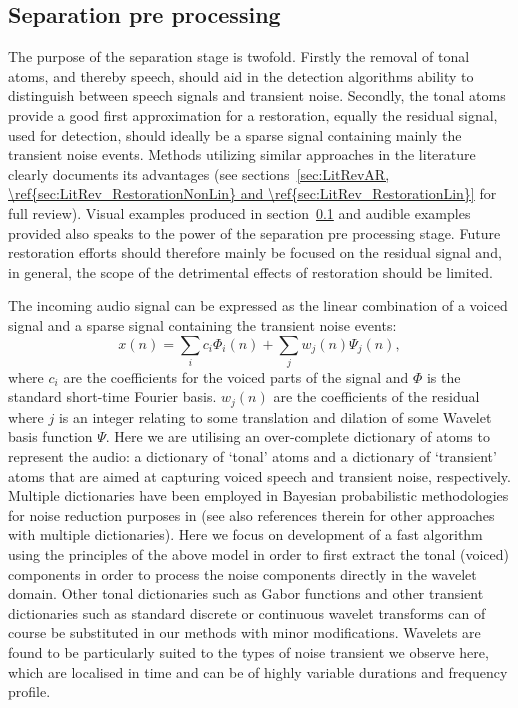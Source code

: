 \subsection{Separation pre processing}\label{sec:WPseparation}
The purpose of the separation stage is twofold. Firstly the removal of tonal atoms, and thereby speech, should aid in the detection algorithms ability to distinguish between speech signals and transient noise. Secondly, the tonal atoms provide a good first approximation for a restoration, equally the residual signal, used for detection, should ideally be a sparse signal containing mainly the transient noise events. Methods utilizing similar approaches in the literature clearly documents its advantages\cite{Godsill1998book} (see sections~\ref{sec:LitRevAR, \ref{sec:LitRev_RestorationNonLin} and \ref{sec:LitRev_RestorationLin}} for full review). Visual examples produced in section~\ref{sec:WPseparation} and audible examples provided  also speaks to the power of the separation pre processing stage.
Future restoration efforts should therefore mainly be focused on the residual signal and, in general, the scope of the detrimental effects of restoration should be limited.

The incoming audio signal can be expressed as the linear combination of a voiced signal and a sparse signal containing the transient noise events:
\begin{equation}\label{eq:modelgeneral}
    x(n) = \sum_i c_i \Phi_i(n) + \sum_{j} w_{j}(n) \Psi_{j}(n),
\end{equation}
where $c_i$ are the coefficients for the voiced parts of the signal and $\Phi$ is the standard short-time Fourier basis. $w_{j}(n)$ are the coefficients of the residual where $j$ is an integer relating to some translation and dilation of some Wavelet basis function $\Psi$. Here we are utilising an over-complete dictionary of atoms to represent the audio: a dictionary of `tonal' atoms and a dictionary of `transient' atoms that are aimed at capturing voiced speech and transient noise, respectively. Multiple dictionaries have been employed in Bayesian probabilistic methodologies for noise reduction purposes in \cite{Fevotte2006}\cite{Fevotte2008} (see also references therein for other approaches with multiple dictionaries). Here we focus on development of a fast algorithm using the principles of the above model in order to first extract the tonal (voiced) components in order to process the noise components directly in the wavelet domain. Other tonal dictionaries such as Gabor functions and other transient dictionaries such as standard discrete or continuous wavelet transforms can of course be substituted in our methods with minor modifications. Wavelets are found to be particularly suited to the types of noise transient we observe here, which are localised in time and can be of highly variable durations and frequency profile.

